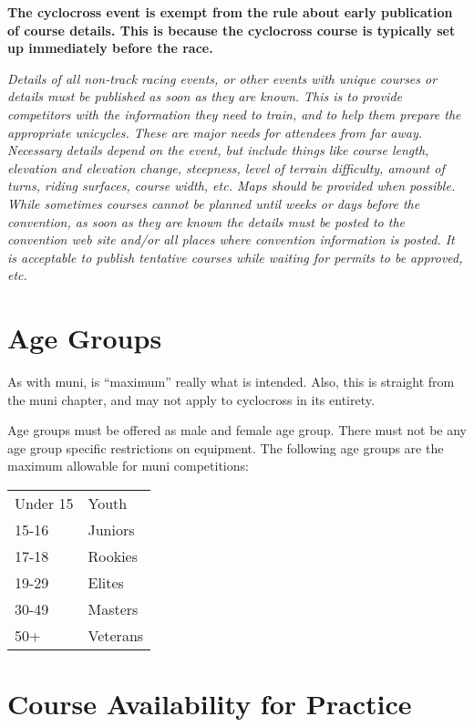 \textbf{The cyclocross event is exempt from the rule about early publication of course details. This is because the cyclocross course is typically set up immediately before the race.}

\textit{Details of all non-track racing events, or other events with unique courses or details must be published as soon as they are known. 
This is to provide competitors with the information they need to train, and to help them prepare the appropriate unicycles.
These are major needs for attendees from far away. 
Necessary details depend on the event, but include things like course length, elevation and elevation change, steepness, level of terrain difficulty, amount of turns, riding surfaces, course width, etc.
Maps should be provided when possible. 
While sometimes courses cannot be planned until weeks or days before the convention, as soon as they are known the details must be posted to the convention web site and/or all places where convention information is posted. 
It is acceptable to publish tentative courses while waiting for permits to be approved, etc.}

\section{Age Groups}

\begin{framed}
As with muni, is ``maximum'' really what is intended.  Also, this is straight from the muni chapter, and may not apply to cyclocross in its entirety.
\end{framed}

Age groups must be offered as male and female age group.
There must not be any age group specific restrictions on equipment.
The following age groups are the maximum allowable for muni competitions:

\begin{tabular}{ l l}
Under 15 & Youth \\
15-16 & Juniors \\
17-18 & Rookies \\
19-29 & Elites \\
30-49 & Masters \\
50+ & Veterans \\
\end{tabular}

\section{Course Availability for Practice}

